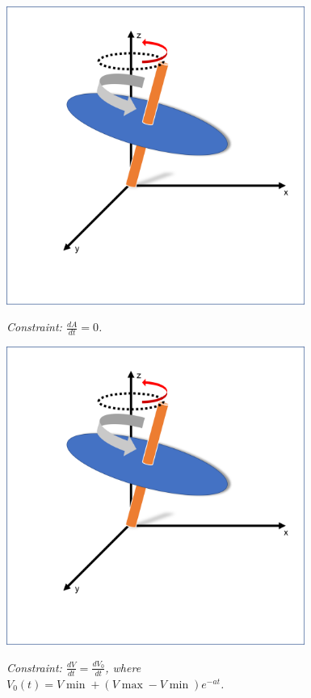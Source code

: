 \documentclass[10pt]{beamer}
\begin{document}
\begin{frame}
\begin{figure}
	\centering
	\includegraphics[width=0.87\textwidth]{sphere1.png}

	\vspace{5mm}
	\emph{Constraint: $\frac{dA}{dt} = 0$.}
\end{figure}
\end{frame}

\begin{frame}
\begin{figure}
	\centering
	\includegraphics[width=0.87\textwidth]{sphere1.png}

	\vspace{5mm}
	\emph{Constraint: $\frac{dV}{dt} = \frac{dV_{0}}{dt}$, where $V_{0}(t) = V\min + (V\max-V\min)e^{-at}$.}
\end{figure}

\end{frame}
\end{document}
